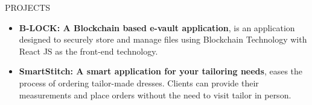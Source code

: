 \documentclass{resume} %
\begin{document}
\begin{rSection}{PROJECTS}
    \begin{itemize}

        \item \textbf{B-LOCK: A Blockchain based e-vault application}{, is
                  an application designed to securely store and manage
                  files using Blockchain Technology with React JS as the front-end technology.
              }


        \item \textbf{SmartStitch: A smart application for your tailoring needs}{, eases the process of ordering tailor-made dresses. Clients can provide their measurements and place orders without the need to visit tailor in person.}




    \end{itemize}


\end{rSection}
\end{document}

